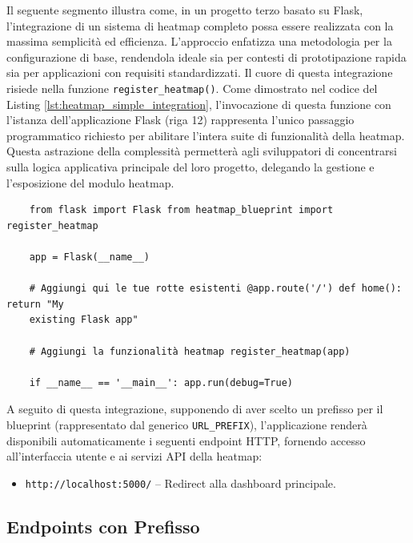 Il seguente segmento illustra come, in un progetto terzo basato su Flask, l'integrazione
di un sistema di heatmap completo possa essere realizzata con la massima semplicità
ed efficienza. L'approccio enfatizza una metodologia  per
la configurazione di base, rendendola ideale sia per contesti di prototipazione
rapida sia per applicazioni con requisiti standardizzati. Il cuore di questa integrazione
risiede nella funzione \texttt{register\_heatmap()}. Come dimostrato nel codice del
Listing \ref{lst:heatmap_simple_integration}, l'invocazione di questa funzione
con l'istanza dell'applicazione Flask (riga 12) rappresenta l'unico passaggio
programmatico richiesto per abilitare l'intera suite di funzionalità della
heatmap. Questa astrazione della complessità permetterà agli sviluppatori di concentrarsi
sulla logica applicativa principale del loro progetto, delegando la gestione e l'esposizione
del modulo heatmap.

\begin{listing}
  [H]
  \caption{Esempio di Integrazione Semplificata della Heatmap in un Progetto
  Flask}
  \label{lst:heatmap_simple_integration}
  \begin{verbatim}
    from flask import Flask from heatmap_blueprint import register_heatmap

    app = Flask(__name__)

    # Aggiungi qui le tue rotte esistenti @app.route('/') def home(): return "My
    existing Flask app"

    # Aggiungi la funzionalità heatmap register_heatmap(app)

    if __name__ == '__main__': app.run(debug=True)
  \end{verbatim}
\end{listing}

A seguito di questa integrazione, supponendo di aver scelto un prefisso per il
blueprint (rappresentato dal generico \texttt{URL\_PREFIX}), l'applicazione
renderà disponibili automaticamente i seguenti endpoint HTTP, fornendo accesso all'interfaccia
utente e ai servizi API della heatmap:

\begin{itemize}
  \item \texttt{http://localhost:5000/} -- Redirect alla dashboard principale.
\end{itemize}

\subsection{Endpoints con Prefisso} %
\label{ss:endpoints}

